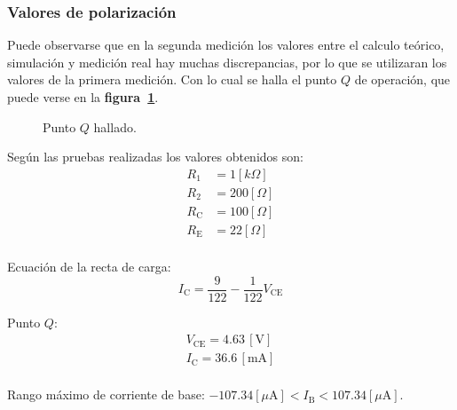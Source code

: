 \subsubsection{Valores de polarización}
Puede observarse que en la segunda medición los valores entre el calculo
teórico, simulación y medición real hay muchas discrepancias, por lo que se
utilizaran los valores de la primera medición. Con lo cual se halla el punto $Q$
de operación, que puede verse en la \textbf{figura~\ref{curva02}}.

\begin{figure}[!ht]
    \centering
    
    \caption{Punto $Q$ hallado.}
    \label{curva02}
\end{figure}

Según las pruebas realizadas los valores obtenidos son:
\begin{equation*}
    \begin{split}
        R_{\text{1}} &= 1[k\Omega]\\
        R_{\text{2}} &= 200[\Omega]\\
        R_{\text{C}} &= 100[\Omega]\\
        R_{\text{E}} &= 22[\Omega]\\
\end{split}
\end{equation*}

Ecuación de la recta de carga:
\begin{equation*}
    I_{\text{C}} = \frac{9}{122} - \frac{1}{122}V_{\text{CE}}
\end{equation*}

Punto $Q$:
\begin{equation*}
    \begin{split}
        V_{\text{CE}} = 4.63\,[\text{V}]\\
        I_{\text{C}} = 36.6\,[\text{mA}]\\
    \end{split}
\end{equation*}

Rango máximo de corriente de base:
$-107.34[\mu{\text{A}}] < I_{\text{B}} < 107.34[\mu{\text{A}}]$.

